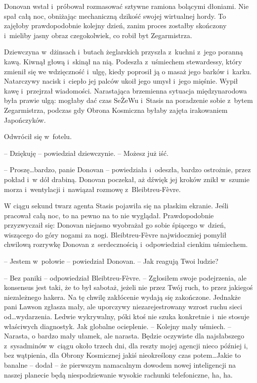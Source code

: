 \documentclass[oneside,polish,11pt,sfheadings]{mwbk}
\begin{document}
Donovan wstał i~próbował rozmasować sztywne ramiona bolącymi dłoniami.
Nie spał całą noc, obniżając mechaniczną dzikość swojej wirtualnej
hordy. To zajęłoby prawdopodobnie kolejny dzień, zanim proces zostałby
skończony i~mieliby jasny obraz czegokolwiek, co robił byt Zegarmistrza.

Dziewczyna w~dżinsach i~butach żeglarskich przyszła z~kuchni z~jego
poranną kawą. Kiwnął głową i~skinął na nią. Podeszła z~uśmiechem
stewardessy, który zmienił się we wdzięczność i~ulgę, kiedy poprosił ją
o masaż jego barków i~karku. Natarczywy nacisk i~ciepło jej palców ukoił
jego umysł i~jego mięśnie. Wypił kawę i~przejrzał wiadomości.
Narastająca brzemienna sytuacja międzynarodowa była prawie ulgą: mogłaby
dać czas SeŻeWu i~Stasis na poradzenie sobie z~bytem Zegarmistrza,
podczas gdy Obrona Kosmiczna byłaby zajęta irakowaniem Japończyków.

Odwrócił się w~fotelu. 

-- Dziękuję -- powiedział dziewczynie. -- Możesz już
iść.

-- Proszę\ldots bardzo, panie Donovan -- powiedziała i~odeszła, bardzo
ostrożnie, przez pokład i~w dół drabiną. Donovan poczekał, aż dźwięk jej
kroków znikł w~szumie morza i~wentylacji i~nawiązał rozmowę z~Bleibtreu-Fèvre.

W ciągu sekund twarz agenta Stasis pojawiła się na płaskim ekranie.
Jeśli pracował całą noc, to na pewno na to nie wyglądał. Prawdopodobnie
przyzwyczaił się: Donovan niejasno wyobrażał go sobie śpiącego w~dzień,
wiszącego do góry nogami za nogi. Bleibtreu-Fèvre najwidoczniej pomylił
chwilową rozrywkę Donovan z~serdecznością i~odpowiedział cienkim
uśmiechem.

-- Jestem w~połowie -- powiedział Donovan. -- Jak reagują Twoi ludzie?

-- Bez paniki -- odpowiedział Bleibtreu-Fèvre. -- Zgłosiłem swoje
podejrzenia, ale konsensus jest taki, że to był sabotaż, jeżeli nie
przez Twój ruch, to przez jakiegoś niezależnego hakera. Na tę chwilę
zakłócenie wydają się zakończone. Jednakże pani Lawson zgłasza mały, ale
uporczywy niezarejestrowany wzrost ruchu sieci od\ldots wydarzenia. Ledwie
wykrywalny, póki ktoś nie szuka konkretnie i~nie stosuje właściwych
diagnostyk. Jak globalne ocieplenie. -- Kolejny mały uśmiech. -- Narasta,
o bardzo mały ułamek, ale narasta. Będzie oczywiste dla najsłabszego z~sysadminów w~ciągu około trzech dni, dla reszty mojej agencji nieco
później i, bez wątpienia, dla Obrony Kosmicznej jakiś nieokreślony czas
potem\ldots Jakie to banalne -- dodał -- że pierwszym namacalnym dowodem
nowej inteligencji na naszej planecie będą niespodziewanie wysokie
rachunki telefoniczne, ha, ha.
\end{document}
